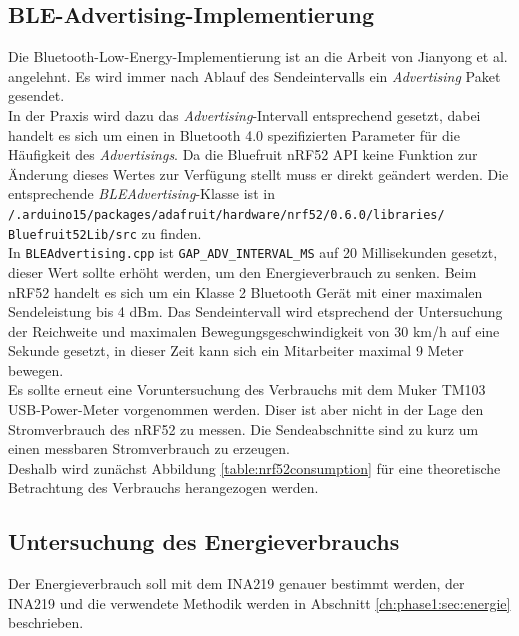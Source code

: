 \subsection{BLE-Advertising-Implementierung}
\label{ch:phase3:sec:advertising}
Die Bluetooth-Low-Energy-Implementierung ist an die Arbeit von Jianyong et al. angelehnt.
Es wird immer nach Ablauf des Sendeintervalls ein \emph{Advertising} Paket gesendet.\\
In der Praxis wird dazu das \emph{Advertising}-Intervall entsprechend gesetzt, dabei handelt es sich um einen in Bluetooth 4.0 spezifizierten Parameter für die Häufigkeit des \emph{Advertisings}.
Da die Bluefruit nRF52 API keine Funktion zur Änderung dieses Wertes zur Verfügung stellt muss er direkt geändert werden.
Die entsprechende \emph{BLEAdvertising}-Klasse ist in \\\texttt{/.arduino15/packages/adafruit/hardware/nrf52/0.6.0/libraries/}\\\texttt{Bluefruit52Lib/src} zu finden. \\
In \texttt{BLEAdvertising.cpp} ist \texttt{GAP\_ADV\_INTERVAL\_MS} auf 20 Millisekunden gesetzt, dieser Wert sollte erhöht werden, um den Energieverbrauch zu senken.
Beim nRF52 handelt es sich um ein Klasse 2 Bluetooth Gerät mit einer maximalen Sendeleistung bis 4 dBm.
Das Sendeintervall wird etsprechend der Untersuchung der Reichweite und maximalen Bewegungsgeschwindigkeit von 30 km/h auf eine Sekunde gesetzt, in dieser Zeit kann sich ein Mitarbeiter maximal 9 Meter bewegen.\\
Es sollte erneut eine Voruntersuchung des Verbrauchs mit dem Muker TM103 USB-Power-Meter vorgenommen werden.
Diser ist aber nicht in der Lage den Stromverbrauch des nRF52 zu messen.
Die Sendeabschnitte sind zu kurz um einen messbaren Stromverbrauch zu erzeugen.\\
Deshalb wird zunächst Abbildung \ref{table:nrf52consumption} für eine theoretische Betrachtung des Verbrauchs herangezogen werden. 




\subsection{Untersuchung des Energieverbrauchs}
Der Energieverbrauch soll mit dem INA219 genauer bestimmt werden, der INA219 und die verwendete Methodik werden in Abschnitt \ref{ch:phase1:sec:energie} beschrieben.

